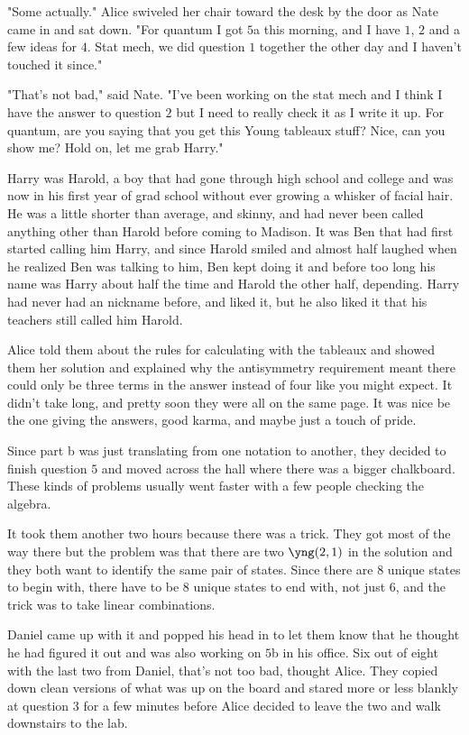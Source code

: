 "Some actually." Alice swiveled her chair toward the desk by the door as Nate came in and sat down. "For quantum I got $5$a this morning, and I have $1$, $2$ and a few ideas for $4$. Stat mech, we did question $1$ together the other day and I haven't touched it since." 

"That's not bad," said Nate. "I've been working on the stat mech and I think I have the answer to question $2$ but I need to really check it as I write it up. For quantum, are you saying that you get this Young tableaux stuff? Nice, can you show me? Hold on, let me grab Harry." 

Harry was Harold, a boy that had gone through high school and college and was now in his first year of grad school without ever growing a whisker of facial hair. He was a little shorter than average, and skinny, and had never been called anything other than Harold before coming to Madison. It was Ben that had first started calling him Harry, and since Harold smiled and almost half laughed when he realized Ben was talking to him, Ben kept doing it and before too long his name was Harry about half the time and Harold the other half, depending. Harry had never had an nickname before, and liked it, but he also liked it that his teachers still called him Harold. 

\mypause

Alice told them about the rules for calculating with the tableaux and showed them her solution and explained why the antisymmetry requirement meant there could only be three terms in the answer instead of four like you might expect. It didn't take long, and pretty soon they were all on the same page. It was nice be the one giving the answers, good karma, and maybe just a touch of pride.

Since part b was just translating from one notation to another, they decided to finish question $5$ and moved across the hall where there was a bigger chalkboard. These kinds of problems usually went faster with a few people checking the algebra. 

It took them another two hours because there was a trick. They got most of the way there but the problem was that there are two $\yng(2,1)$ in the solution and they both want to identify the same pair of states. Since there are 8 unique states to begin with, there have to be 8 unique states to end with, not just 6, and the trick was to take linear combinations.

Daniel came up with it and popped his head in to let them know that he thought he had figured it out and was also working on $5$b in his office. Six out of eight with the last two from Daniel, that's not too bad, thought Alice. They copied down clean versions of what was up on the board and stared more or less blankly at question 3 for a few minutes before Alice decided to leave the two and walk downstairs to the lab. 

\mypause




